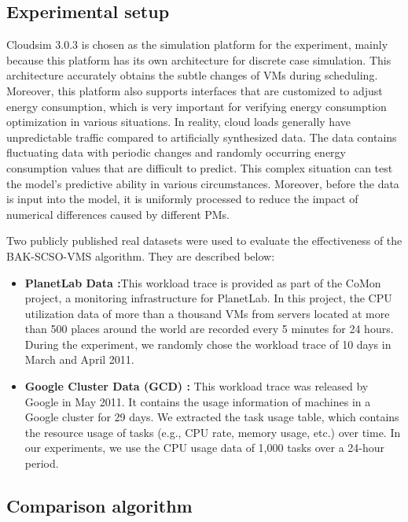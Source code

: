 \documentclass[conference]{{IEEEtran}}
\begin{document}
\subsection{Experimental setup}

Cloudsim 3.0.3 is chosen as the simulation platform for the experiment, mainly because this platform has its own architecture for discrete case simulation. This architecture accurately obtains the subtle changes of VMs during scheduling. Moreover, this platform also supports interfaces that are customized to adjust energy consumption, which is very important for verifying energy consumption optimization in various situations. In reality, cloud loads generally have unpredictable traffic compared to artificially synthesized data. The data contains fluctuating data with periodic changes and randomly occurring energy consumption values that are difficult to predict. This complex situation can test the model's predictive ability in various circumstances. Moreover, before the data is input into the model, it is uniformly processed to reduce the impact of numerical differences caused by different PMs.

Two publicly published real datasets were used to evaluate the effectiveness of the BAK-SCSO-VMS algorithm. They are described below:

\begin{itemize}
\item\textbf{PlanetLab Data \cite{park2006comon}:}This workload trace is provided as part of the CoMon project, a monitoring infrastructure for PlanetLab. In this project, the CPU utilization data of more than a thousand VMs from servers located at more than 500 places around the world are recorded every 5 minutes for 24 hours. During the experiment, we randomly chose the workload trace of 10 days in March and April 2011.

\item \textbf{Google Cluster Data (GCD) \cite{reiss2011google}:} This workload trace was released by Google in May 2011. It contains the usage information of machines in a Google cluster for 29 days. We extracted the task usage table, which contains the resource usage of tasks (e.g., CPU rate, memory usage, etc.) over time. In our experiments, we use the CPU usage data of 1,000 tasks over a 24-hour period.  

\end{itemize}

\subsection{Comparison algorithm}
\end{document}
